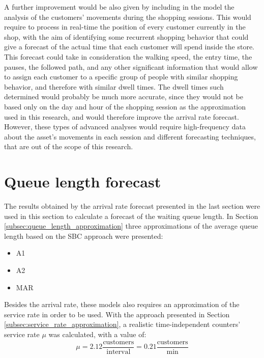 A further improvement would be also given by including in the model the analysis of the customers’ movements during the shopping sessions. This would require to process in real-time the position of every customer currently in the shop, with the aim of identifying some recurrent shopping behavior that could give a forecast of the actual time that each customer will spend inside the store. This forecast could take in consideration the walking speed, the entry time, the pauses, the followed path, and any other significant information that would allow to assign each customer to a specific group of people with similar shopping behavior, and therefore with similar dwell times. The dwell times such determined would probably be much more accurate, since they would not be based only on the day and hour of the shopping session as the approximation used in this research, and would therefore improve the arrival rate forecast. However, these types of advanced analyses would require high-frequency data about the asset’s movements in each session and different forecasting techniques, that are out of the scope of this research.

\section{Queue length forecast}
\label{sec:queue_length_forecast_results}

The results obtained by the arrival rate forecast presented in the last section were used in this section to calculate a forecast of the waiting queue length. In Section \ref{subsec:queue_length_approximation} three approximations of the average queue length based on the SBC approach were presented:
\begin{itemize}
  \item A1
  \item A2
  \item MAR
\end{itemize}

Besides the arrival rate, these models also requires an approximation of the service rate in order to be used. With the approach presented in Section \ref{subsec:service_rate_approximation}, a realistic time-independent counters’ service rate \( \mu \) was calculated, with a value of:
\begin{equation}
  \mu = 2.12 \frac{\text{customers}}{\text{interval}} = 0.21 \frac{\text{customers}}{\text{min}}
\end{equation}


